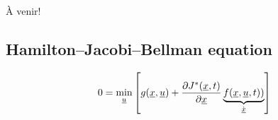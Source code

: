 À venir!

\subsection{Hamilton–Jacobi–Bellman equation}

\begin{align}
0 =
\operatornamewithlimits{min}\limits_{\col{u}}
\left[
g(\col{x} , \col{u} ) + \frac{\partial	J^*(\col{x},t)}{\partial \col{x} }
\underbrace{
f(\col{x} , \col{u} , t) )
}_{\dot{\col{x}}}
\right]
\label{eq:hjb}
\end{align} 
